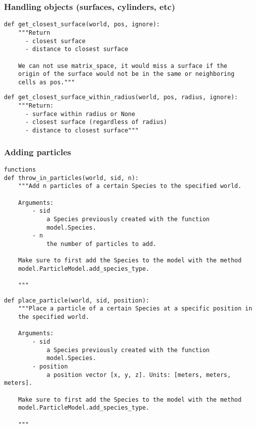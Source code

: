 \documentclass[a4paper,10pt]{article}
\begin{document}
\subsubsection{Handling objects (surfaces, cylinders, etc)}

\begin{verbatim}
def get_closest_surface(world, pos, ignore):
    """Return
      - closest surface
      - distance to closest surface
    
    We can not use matrix_space, it would miss a surface if the 
    origin of the surface would not be in the same or neighboring 
    cells as pos."""
\end{verbatim}

\begin{verbatim}
def get_closest_surface_within_radius(world, pos, radius, ignore):
    """Return:
      - surface within radius or None
      - closest surface (regardless of radius)
      - distance to closest surface"""
\end{verbatim}

\subsubsection{Adding particles}
\begin{verbatim}
functions
def throw_in_particles(world, sid, n):
    """Add n particles of a certain Species to the specified world.

    Arguments:
        - sid
            a Species previously created with the function 
            model.Species.
        - n
            the number of particles to add.

    Make sure to first add the Species to the model with the method
    model.ParticleModel.add_species_type.

    """
\end{verbatim}

\begin{verbatim}
def place_particle(world, sid, position):
    """Place a particle of a certain Species at a specific position in 
    the specified world.

    Arguments:
        - sid
            a Species previously created with the function 
            model.Species.
        - position
            a position vector [x, y, z]. Units: [meters, meters, meters].

    Make sure to first add the Species to the model with the method 
    model.ParticleModel.add_species_type.

    """
\end{verbatim}
\end{document}
